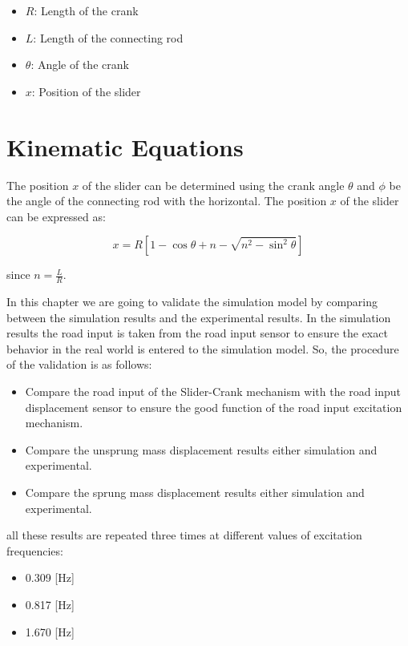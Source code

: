 \begin{itemize}
	\item $R$: Length of the crank
	\item $L$: Length of the connecting rod
	\item $\theta $: Angle of the crank 
	\item $x$: Position of the slider
\end{itemize}
\section*{Kinematic Equations}

The position \( x \) of the slider can be determined using the crank angle \( \theta \) and \( \phi \) be the angle of the connecting rod with the horizontal. The position \( x \) of the slider can be expressed as:

\[
x = R \left[ 1 - \cos \theta + n - \sqrt{n^2 - \sin^2 \theta} \right]
\]

since \( n = \frac{L}{R} \).

In this chapter we are going to validate the simulation model by comparing between the simulation results and the experimental results.
\newline
In the simulation results the road input is taken from the road input sensor to ensure the exact behavior in the real world is entered to the simulation model. So, the procedure of the validation is as follows:
\begin{itemize}
	\item Compare the road input of the Slider-Crank mechanism with the road input displacement sensor to ensure the good function of the road input excitation mechanism.
	\item Compare the unsprung mass displacement results either simulation and experimental.
	\item Compare the sprung mass displacement results either simulation and experimental.
\end{itemize}
all these results are repeated three times at different values of excitation frequencies:
\begin{itemize}
	\item 0.309 [Hz]
	\item 0.817 [Hz]
	\item 1.670 [Hz]
\end{itemize}

